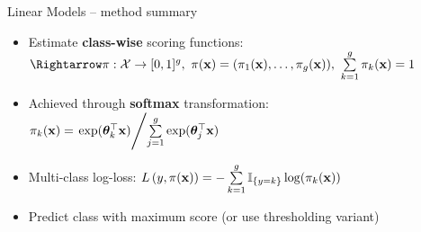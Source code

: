 \begin{vbframe}{Linear Models -- method summary}
\medskip


\medskip


\begin{itemize}
  \item Estimate \textbf{class-wise} scoring functions:
  $\Rightarrow \pi: \Xspace \rightarrow \unitint^g, ~
  \pix = (\pikx[1], \dots, \pikx[g]), ~\sumkg \pikx = 1$
  \item Achieved through \textbf{softmax} transformation: 
  $\pi_{k}(\mathbf{x}) = \left. \exp(\bm{\theta}_k^\top \mathbf{x}) \middle/ \sum\limits_{j=1}^g \exp(\bm{\theta}_j^\top 
  \mathbf{x}) \right.$
  \item Multi-class log-loss: $L\left(y, \pi(\mathbf{x})\right) = - \sum\limits_{k=1}^g \mathbb{I}_{\{y = k\}} \log(\pi_{k}(\mathbf{x}))$
  \item Predict class with maximum score (or use thresholding variant)
\end{itemize}


\end{vbframe}


